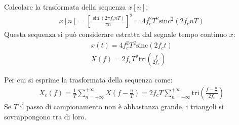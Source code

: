 \documentclass{article}
\newcommand{\sinc}{\mbox{sinc}}
\begin{document}
Calcolare la trasformata della sequenza $x[n]$:
\begin{gather*}
    x[n]=\left[\displaystyle\frac{\sin(2\pi f_cnT)}{\pi n}\right]^2=4f_c^2T^2\sinc^2(2f_cnT)
\end{gather*}
Questa sequenza si può considerare estratta dal segnale tempo continuo $x$:
\begin{gather*}
    x(t)=4f_c^2T^2\sinc(2f_ct)\\
    X(f)=\displaystyle 2f_cT^2\mbox{tri}\left(\frac{f}{2f_c}\right)
\end{gather*}

Per cui si esprime la trasformata della sequenza come:
\begin{gather}
    X_c(f)=\displaystyle\frac{1}{T}\sum_{n=-\infty}^{+\infty}X\left(f-\frac{n}{T}\right)=2f_cT\sum_{n=-\infty}^{+\infty}\mbox{tri}\left(\frac{f-\frac{n}{T}}{2f_c}\right)
\end{gather}
Se $T$ il passo di campionamento non è abbastanza grande, i triangoli si sovrappongono tra di loro. 
\end{document}
